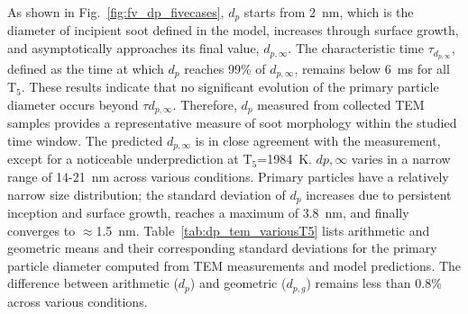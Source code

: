 As shown in Fig.~\ref{fig:fv_dp_fivecases}, $d_p$ starts from 2~nm, which is the diameter of incipient soot defined in the model, increases through surface growth, and asymptotically approaches its final value, $d_{p,\infty}$. The characteristic time $\tau_{d_{p,\infty}}$, defined as the time at which $d_p$ reaches 99\% of $d_{p,\infty}$, remains below 6~ms for all T$_5$. These results indicate that no significant evolution of the primary particle diameter occurs beyond $\tau{d_{p,\infty}}$. Therefore, $d_p$ measured from collected TEM samples provides a representative measure of soot morphology within the studied time window. The predicted $d_{p,\infty}$ is in close agreement with the measurement, except for a noticeable underprediction at T$_5$=1984~K. $d{p,\infty}$ varies in a narrow range of 14-21~nm across various conditions. Primary particles have a relatively narrow size distribution; the standard deviation of $d_p$ increases due to persistent inception and surface growth, reaches a maximum of 3.8~nm, and finally converges to $\approx$1.5~nm. Table~\ref{tab:dp_tem_variousT5} lists arithmetic and geometric means and their corresponding standard deviations for the primary particle diameter computed from TEM measurements and model predictions. The difference between arithmetic ($d_p$) and geometric ($d_{p,g}$) remains less than 0.8\% across various conditions.

